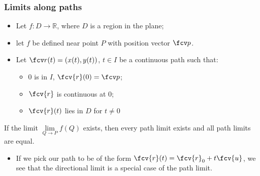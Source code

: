 \begin{frame}
\frametitle{Limits along paths}
\begin{definition}
\begin{itemize}
\item<1-> Let $f: D\to \mathbb R$, where $D$ is a region in the plane;
\item<2-> let  $f$ be defined near point $P$ with position vector $\fcv p$.
\item<3-> Let $\fcv r(t)=(x(t), y(t))$, $t\in I$ be a continuous path such that:
\begin{itemize}
\item<3-> $0$ is in $I$, $\fcv{r}(0) = \fcv p$;
\item<4-> $\fcv{r}$ is continuous at $0$;
\item<5-> $\fcv{r}(t)$ lies in $D$ for $t\neq 0$
\end{itemize}
\end{itemize}
\end{definition}
\end{frame}
\begin{frame}
\begin{theorem}
If the limit $\lim\limits_{Q\to P}f(Q) $ exists, then every path limit exists and all path limits are equal.
\end{theorem}
\begin{itemize}
\item<2-> If we pick our path to be of the form $\fcv{r}(t) = \fcv{r}_0+t\fcv{u}$, we see that the directional limit is a special case of the path limit.
\end{itemize}
\end{frame}